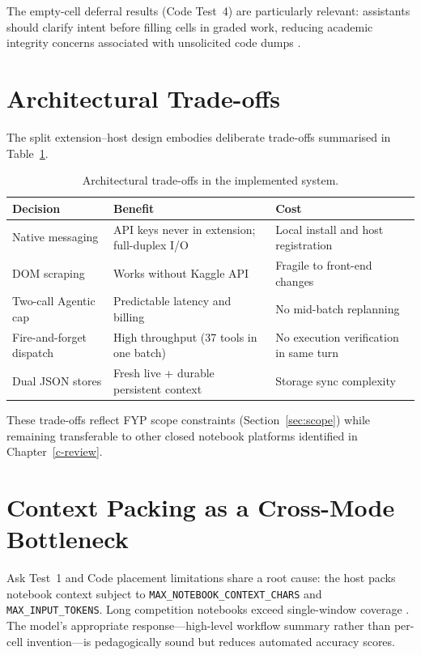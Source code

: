 The empty-cell deferral results (Code Test~4) are particularly relevant: assistants should clarify intent before filling cells in graded work, reducing academic integrity concerns associated with unsolicited code dumps \parencite{vaithilingam2022expectation}.

\section{Architectural Trade-offs}
\label{sec:arch-tradeoffs}

The split extension--host design embodies deliberate trade-offs summarised in Table~\ref{tab:tradeoffs}.

\begin{table}[!ht]
\centering
\caption{Architectural trade-offs in the implemented system.}
\label{tab:tradeoffs}
\small
\begin{tabular}{|p{3.4cm}|p{4.8cm}|p{4.8cm}|}
\hline
\textbf{Decision} & \textbf{Benefit} & \textbf{Cost} \\ \hline
Native messaging & API keys never in extension; full-duplex I/O & Local install and host registration \\ \hline
DOM scraping & Works without Kaggle API & Fragile to front-end changes \\ \hline
Two-call Agentic cap & Predictable latency and billing & No mid-batch replanning \\ \hline
Fire-and-forget dispatch & High throughput (37 tools in one batch) & No execution verification in same turn \\ \hline
Dual JSON stores & Fresh live + durable persistent context & Storage sync complexity \\ \hline
\end{tabular}
\end{table}

These trade-offs reflect FYP scope constraints (Section~\ref{sec:scope}) while remaining transferable to other closed notebook platforms identified in Chapter~\ref{c-review}.

\section{Context Packing as a Cross-Mode Bottleneck}
\label{sec:context-bottleneck}

Ask Test~1 and Code placement limitations share a root cause: the host packs notebook context subject to \texttt{MAX\_NOTEBOOK\_CONTEXT\_CHARS} and \texttt{MAX\_INPUT\_TOKENS}. Long competition notebooks exceed single-window coverage \parencite{wei2022chain}. The model's appropriate response---high-level workflow summary rather than per-cell invention---is pedagogically sound but reduces automated accuracy scores.

